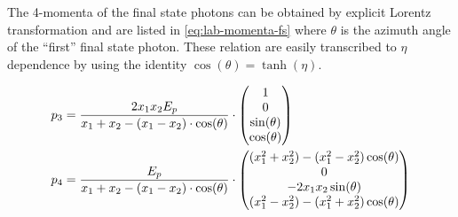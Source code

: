 \begin{wrapfigure}{R}{0.4\textwidth}
\centering
{}
\end{wrapfigure}
The 4-momenta of the final state photons can be obtained by explicit
Lorentz transformation and are listed in \cref{eq:lab-momenta-fs}
where \(\theta\) is the azimuth angle of the ``first'' final state
photon.  These relation are easily transcribed to \(\eta\) dependence
by using the identity \(\cos(\theta) = \tanh(\eta)\).


\begin{align}
  \label{eq:lab-momenta-fs}
  p_3 &= \frac{2x_1x_2E_p}{x_1+x_2 - (x_1 - x_2)\cdot\cos(\theta)}\cdot
  \mqty(1 \\ 0 \\ \sin(\theta) \\ \cos(\theta)) \\
  p_4 &= \frac{E_p}{x_1+x_2 - (x_1 - x_2)\cdot\cos(\theta)}\cdot
  \mqty((x_1^2+x_2^2) - (x_1^2-x_2^2)\cos(\theta) \\ 0 \\ -2x_1x_2\sin(\theta) \\ (x_1^2-x_2^2) - (x_1^2+x_2^2)\cos(\theta))
\end{align}

